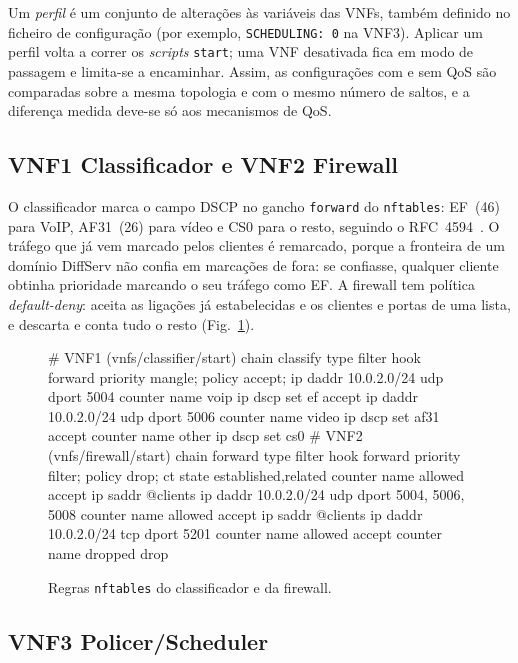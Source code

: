 \documentclass[a4paper]{llncs}
\begin{document}
Um \emph{perfil} é um conjunto de alterações às variáveis das VNFs, também definido
no ficheiro de configuração (por exemplo, \texttt{SCHEDULING: 0} na VNF3). Aplicar um perfil
volta a correr os \emph{scripts} \texttt{start}; uma VNF desativada fica em modo de
passagem e limita-se a encaminhar. Assim, as configurações com e sem QoS são
comparadas sobre a mesma topologia e com o mesmo número de saltos, e a diferença
medida deve-se só aos mecanismos de QoS.

\subsection{VNF1 Classificador e VNF2 Firewall}

O classificador marca o campo DSCP no gancho \texttt{forward} do \texttt{nftables}:
EF~(46) para VoIP, AF31~(26) para vídeo e CS0 para o resto, seguindo o
RFC~4594~\cite{rfc4594}. O tráfego que já vem marcado pelos clientes é remarcado,
porque a fronteira de um domínio DiffServ não confia em marcações de fora: se
confiasse, qualquer cliente obtinha prioridade marcando o seu tráfego como EF. A
firewall tem política \emph{default-deny}: aceita as ligações já estabelecidas e os
clientes e portas de uma lista, e descarta e conta tudo o resto
(Fig.~\ref{fig:nft}).

\begin{figure}[!tb]
\begin{code}
# VNF1 (vnfs/classifier/start)
chain classify {
  type filter hook forward priority mangle; policy accept;
  ip daddr 10.0.2.0/24 udp dport 5004 counter name voip  ip dscp set ef   accept
  ip daddr 10.0.2.0/24 udp dport 5006 counter name video ip dscp set af31 accept
  counter name other ip dscp set cs0
}
# VNF2 (vnfs/firewall/start)
chain forward {
  type filter hook forward priority filter; policy drop;
  ct state established,related counter name allowed accept
  ip saddr @clients ip daddr 10.0.2.0/24 udp dport { 5004, 5006, 5008 }
                                                   counter name allowed accept
  ip saddr @clients ip daddr 10.0.2.0/24 tcp dport { 5201 } counter name allowed accept
  counter name dropped drop
}
\end{code}
\caption{Regras \texttt{nftables} do classificador e da firewall.}
\label{fig:nft}
\end{figure}

\subsection{VNF3 Policer/Scheduler}
\end{document}
